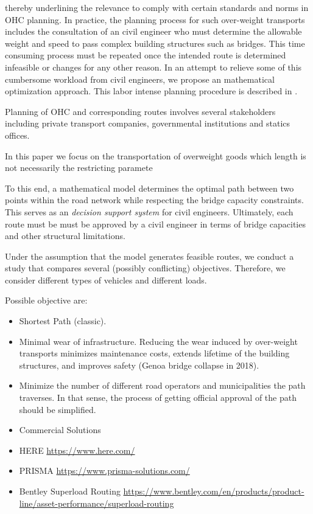thereby underlining the relevance to comply with certain standards and norms in OHC planning. In practice, the planning process for such over-weight transports includes the consultation of an civil engineer who must determine the allowable weight and speed to pass complex building structures such as bridges. This time consuming process must be repeated once the intended route is determined infeasible or changes for any other reason. In an attempt to relieve some of this cumbersome workload from civil engineers, we propose an mathematical optimization approach. This labor intense planning procedure is described in \cite{Osegueda.1999}. 


Planning of OHC and corresponding routes involves several stakeholders including private transport companies, governmental institutions and statics offices.



In this paper we focus on the transportation of overweight goods which length is not necessarily the restricting paramete


To this end, a mathematical model determines the optimal path between two
points within the road network while respecting the bridge capacity constraints.
This serves as an \textit{decision support system} for civil engineers.
Ultimately,  each route must be must be approved by a civil engineer  in terms of
bridge capacities and other structural limitations.

Under the assumption that the model generates feasible routes,
we conduct a study that compares several (possibly conflicting) objectives.
Therefore, we consider different types of vehicles and different loads.

Possible objective are:
\begin{itemize}
  \item Shortest Path (classic).

  \item Minimal wear of infrastructure. Reducing the wear induced by over-weight transports
  minimizes maintenance costs, extends lifetime of the building structures, and
  improves safety (Genoa bridge collapse in 2018).

  \item Minimize the number of different road operators and municipalities the path
  traverses. In that sense, the process of getting official approval of the
  path should be simplified.
\end{itemize}

\begin{itemize}





\item Commercial Solutions

\item HERE
\url{https://www.here.com/}
\item PRISMA
\url{https://www.prisma-solutions.com/}

\item Bentley Superload Routing
\url{https://www.bentley.com/en/products/product-line/asset-performance/superload-routing}

\end{itemize}
